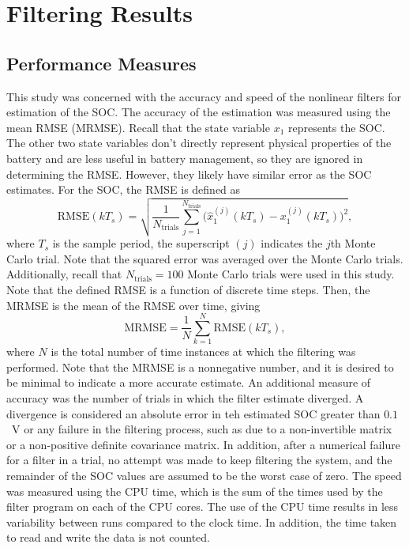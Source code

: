 \documentclass[../zhang_thesis.tex]{subfiles}
\begin{document}
\chapter{Filtering Results}


\section{Performance Measures}

This study was concerned with the accuracy and speed of the nonlinear filters for estimation of the SOC. The accuracy of the estimation was measured using the mean RMSE (MRMSE). Recall that the state variable $x_1$ represents the SOC. The other two state variables don't directly represent physical properties of the battery and are less useful in battery management, so they are ignored in determining the RMSE. However, they likely have similar error as the SOC estimates. For the SOC, the RMSE is defined as
\begin{equation}
    \mathrm{RMSE}(kT_s) = \sqrt{ \frac{1}{N_\text{trials}} \sum_{j=1}^{N_\text{trials}} \Big( \hat{x}_1^{(j)}(kT_s) - x_1^{(j)}(kT_s) \Big)^2 },
\end{equation}
where $T_s$ is the sample period, the superscript $(j)$ indicates the $j$th Monte Carlo trial. Note that the squared error was averaged over the Monte Carlo trials. Additionally, recall that $N_\text{trials}=100$ Monte Carlo trials were used in this study. Note that the defined RMSE is a function of discrete time steps. Then, the MRMSE is the mean of the RMSE over time, giving
\begin{equation}
    \mathrm{MRMSE} = \frac{1}{N} \sum_{k=1}^N \mathrm{RMSE}(kT_s),
\end{equation}
where $N$ is the total number of time instances at which the filtering was performed. Note that the MRMSE is a nonnegative number, and it is desired to be minimal to indicate a more accurate estimate. An additional measure of accuracy was the number of trials in which the filter estimate diverged. A divergence is considered an absolute error in teh estimated SOC greater than $0.1$~V or any failure in the filtering process, such as due to a non-invertible matrix or a non-positive definite covariance matrix. In addition,
after a numerical failure for a filter in a trial, no attempt was made to keep filtering the system, and the remainder of the SOC values are assumed to be the worst case of zero. The speed was measured using the CPU time, which is the sum of the times used by the filter program on each of the CPU cores. The use of the CPU time results in less variability between runs compared to the clock time. In addition, the time taken to read and write the data is not counted.
\end{document}
